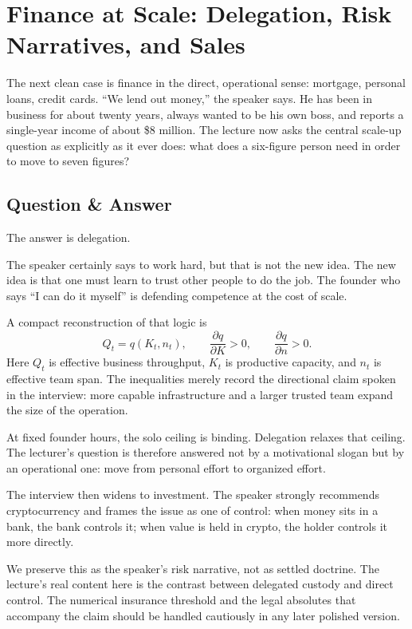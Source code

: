 \section{Finance at Scale: Delegation, Risk Narratives, and Sales}

The next clean case is finance in the direct, operational sense: mortgage, personal loans, credit cards. ``We lend out money,'' the speaker says. He has been in business for about twenty years, always wanted to be his own boss, and reports a single-year income of about \$8 million. The lecture now asks the central scale-up question as explicitly as it ever does: what does a six-figure person need in order to move to seven figures?

\subsection{Question \& Answer}

The answer is delegation.

The speaker certainly says to work hard, but that is not the new idea. The new idea is that one must learn to trust other people to do the job. The founder who says ``I can do it myself'' is defending competence at the cost of scale.

A compact reconstruction of that logic is
\begin{equation}
Q_t = q(K_t,n_t),
\qquad
\frac{\partial q}{\partial K}>0,
\qquad
\frac{\partial q}{\partial n}>0.
\end{equation}
Here \(Q_t\) is effective business throughput, \(K_t\) is productive capacity, and \(n_t\) is effective team span. The inequalities merely record the directional claim spoken in the interview: more capable infrastructure and a larger trusted team expand the size of the operation.

At fixed founder hours, the solo ceiling is binding. Delegation relaxes that ceiling. The lecturer's question is therefore answered not by a motivational slogan but by an operational one: move from personal effort to organized effort.

The interview then widens to investment. The speaker strongly recommends cryptocurrency and frames the issue as one of control: when money sits in a bank, the bank controls it; when value is held in crypto, the holder controls it more directly.

\begin{remark}
We preserve this as the speaker's risk narrative, not as settled doctrine. The lecture's real content here is the contrast between delegated custody and direct control. The numerical insurance threshold and the legal absolutes that accompany the claim should be handled cautiously in any later polished version.
\end{remark}

